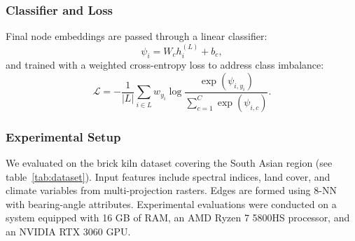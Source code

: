 \documentclass{article}
\theoremstyle{plain}
\theoremstyle{definition}
\theoremstyle{remark}
\begin{document}
\subsubsection{Classifier and Loss}
Final node embeddings are passed through a linear classifier:
\begin{equation}
\psi_i = W_c h_i^{(L)} + b_c,
\end{equation}
and trained with a weighted cross-entropy loss to address class imbalance:
\begin{equation}
\mathcal{L} = -\frac{1}{|L|} \sum_{i \in L} w_{y_i} 
\log \frac{\exp(\psi_{i,y_i})}{\sum_{c=1}^C \exp(\psi_{i,c})}.
\end{equation}

\begin{table}[ht]
\centering
\caption{Performance comparison of graph-based models for brick kiln detection in South Asia. }
\label{tab:model_comparison}
\end{table}
\subsubsection{Experimental Setup}
We evaluated on the brick kiln dataset covering the South Asian region (see table~\ref{tab:dataset}). Input features include spectral indices, land cover, and climate variables from multi-projection rasters. Edges are formed using 8-NN with bearing-angle attributes. Experimental evaluations were conducted on a system equipped with 16 GB of RAM, an AMD Ryzen 7 5800HS processor, and an NVIDIA RTX 3060 GPU.
\end{document}
